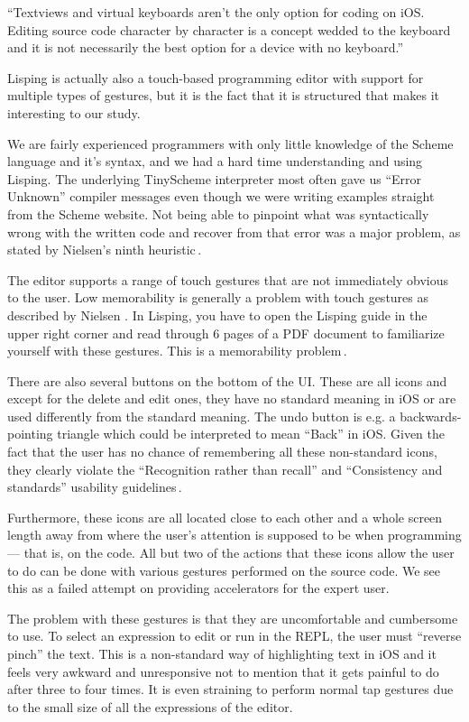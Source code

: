 ``Textviews and virtual keyboards aren't the only option for coding on iOS. Editing source code character by character is a concept wedded to the keyboard and it is not necessarily the best option for a device with no keyboard.''

Lisping is actually also a touch-based programming editor with support for multiple types of gestures, but it is the fact that it is structured that makes it interesting to our study.

We are fairly experienced programmers with only little knowledge of the Scheme language and it's syntax, and we had a hard time understanding and using Lisping. The underlying TinyScheme interpreter most often gave us “Error Unknown” compiler messages even though we were writing examples straight from the Scheme website. Not being able to pinpoint what was syntactically wrong with the written code and recover from that error was a major problem, as stated by Nielsen's ninth heuristic\,\cite{nielsen1990heuristic}.

The editor supports a range of touch gestures that are not immediately obvious to the user. Low memorability is generally a problem with touch gestures as described by Nielsen \cite[p. 141]{nielsen2013mobile}. In Lisping, you have to open the Lisping guide in the upper right corner and read through 6 pages of a PDF document to familiarize yourself with these gestures. This is a memorability problem\,\cite{nielsen1990heuristic}.

There are also several buttons on the bottom of the UI. These are all icons and except for the delete and edit ones, they have no standard meaning in iOS or are used differently from the standard meaning. The undo button is e.g. a backwards-pointing triangle which could be interpreted to mean “Back” in iOS. Given the fact that the user has no chance of remembering all these non-standard icons, they clearly violate the ``Recognition rather than recall'' and ``Consistency and standards'' usability guidelines\,\cite{nielsen1990heuristic}. 

Furthermore, these icons are all located close to each other and a whole screen length away from where the user's attention is supposed to be when programming --- that is, on the code. All but two of the actions that these icons allow the user to do can be done with various gestures performed on the source code. We see this as a failed attempt on providing accelerators for the expert user.

The problem with these gestures is that they are uncomfortable and cumbersome to use. To select an expression to edit or run in the REPL, the user must ``reverse pinch'' the text. This is a non-standard way of highlighting text in iOS and it feels very awkward and unresponsive not to mention that it gets painful to do after three to four times. It is even straining to perform normal tap gestures due to the small size of all the expressions of the editor.

